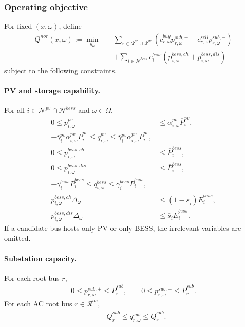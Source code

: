 \subsubsection{Operating objective}

For fixed \((x,\omega)\), define
\begin{align}
Q^{nor}(x,\omega) := 
\min_{y_\omega} \quad
& \sum_{r\in\mathcal{R}^{ac}\cup\mathcal{R}^{dc}}
\left(c_{r,\omega}^{buy} p_{r,\omega}^{sub,+} - c_{r,\omega}^{sell} p_{r,\omega}^{sub,-}\right) \\
&+ \sum_{i\in\mathcal{N}^{bess}} c_i^{bess}
\left(p_{i,\omega}^{bess,ch}+p_{i,\omega}^{bess,dis}\right)
\label{eq:10b-normal-obj}
\end{align}
subject to the following constraints.

\paragraph{PV and storage capability.}
For all \(i\in\mathcal{N}^{pv}\cap\mathcal{N}^{bess}\) and \(\omega\in\Omega\),
\begin{align}
0 \le p_{i,\omega}^{pv} &\le \alpha_{i,\omega}^{pv}\overline P_i^{pv},
\label{eq:10b-pv-limit}\\
-\overline\gamma_i^{pv}\alpha_{i,\omega}^{pv}\overline P_i^{pv}
\le q_{i,\omega}^{pv} \le
\overline\gamma_i^{pv}\alpha_{i,\omega}^{pv}\overline P_i^{pv},
\label{eq:10b-pv-reactive-limit}\\
0 \le p_{i,\omega}^{bess,ch} &\le \overline P_i^{bess},
\label{eq:10b-bess-charge}\\
0 \le p_{i,\omega}^{bess,dis} &\le \overline P_i^{bess},
\label{eq:10b-bess-discharge}\\
-\overline\gamma_i^{bess}\overline P_i^{bess}
\le q_{i,\omega}^{bess} \le
\overline\gamma_i^{bess}\overline P_i^{bess},
\label{eq:10b-bess-reactive-limit}\\
p_{i,\omega}^{bess,ch}\Delta_\omega &\le (1-\underline s_i)\overline E_i^{bess},
\label{eq:10b-bess-energy-charge}\\
p_{i,\omega}^{bess,dis}\Delta_\omega &\le \overline s_i\overline E_i^{bess}.
\label{eq:10b-bess-energy-discharge}
\end{align}
If a candidate bus hosts only PV or only BESS, the irrelevant variables are omitted.

\paragraph{Substation capacity.}
For each root bus \(r\),
\begin{align}
0 \le p_{r,\omega}^{sub,+} \le \overline P_r^{sub},
\qquad
0 \le p_{r,\omega}^{sub,-} \le \overline P_r^{sub}.
\label{eq:10b-substation-bounds}
\end{align}
For each AC root bus \(r\in\mathcal{R}^{ac}\),
\begin{align}
-\overline Q_r^{sub} \le q_{r,\omega}^{sub} \le \overline Q_r^{sub}.
\label{eq:10b-substation-reactive-bounds}
\end{align}

